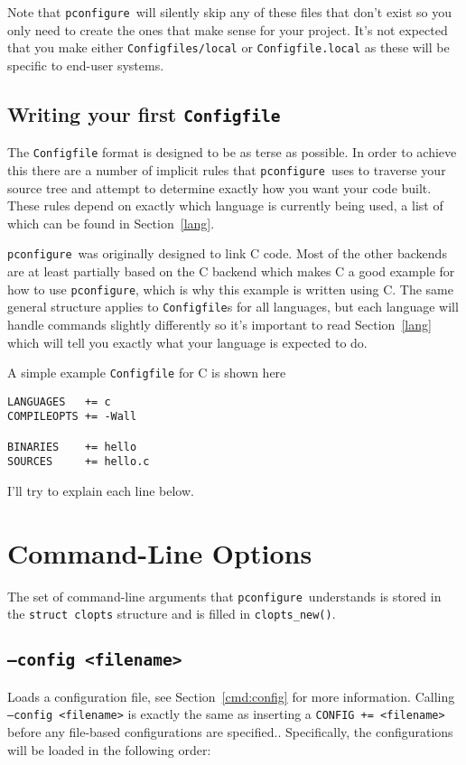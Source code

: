 \documentclass{article}
\newcommand{\pconfigure}{\texttt{pconfigure}}
\begin{document}
Note that \pconfigure\ will silently skip any of these files that
don't exist so you only need to create the ones that make sense for
your project.  It's not expected that you make either
\texttt{Configfiles/local} or \texttt{Configfile.local} as these will
be specific to end-user systems.

\subsection{Writing your first \texttt{Configfile}}

The \texttt{Configfile} format is designed to be as terse as possible.
In order to achieve this there are a number of implicit rules that
\pconfigure\ uses to traverse your source tree and attempt to
determine exactly how you want your code built.  These rules depend on
exactly which language is currently being used, a list of which can be
found in Section~\ref{lang}.

\pconfigure\ was originally designed to link C code.  Most of the
other backends are at least partially based on the C backend which
makes C a good example for how to use \pconfigure, which is why this
example is written using C.  The same general structure applies to
\texttt{Configfile}s for all languages, but each language will handle
commands slightly differently so it's important to read
Section~\ref{lang} which will tell you exactly what your language is
expected to do.

A simple example \texttt{Configfile} for C is shown here
\begin{verbatim}
LANGUAGES   += c
COMPILEOPTS += -Wall

BINARIES    += hello
SOURCES     += hello.c
\end{verbatim}
I'll try to explain each line below.

\section{Command-Line Options \label{cl}}

The set of command-line arguments that \pconfigure\ understands is
stored in the \texttt{struct clopts} structure and is filled in
\texttt{clopts\_new()}.

\subsection{\texttt{--config <filename>}}

Loads a configuration file, see Section~\ref{cmd:config} for more information.
Calling \texttt{--config <filename>} is exactly the same as inserting a
\texttt{CONFIG += <filename>} before any file-based configurations are
specified..  Specifically, the configurations will be loaded in the following
order:
\end{document}
